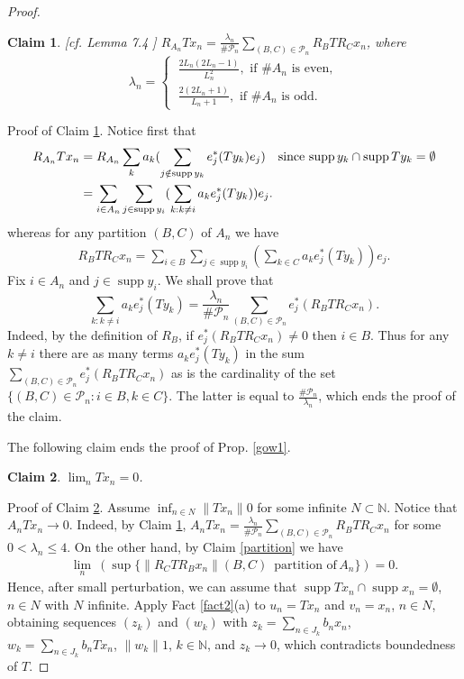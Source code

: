 \documentclass{amsart}
\newtheorem{claim}{Claim}
\numberwithin{subsection}{section}
\numberwithin{equation}{section}
\begin{document}
\begin{proof}
\begin{claim}\label{countlem}[cf. Lemma 7.4 \cite{ABR}] $R_{A_{n}}Tx_{n}=\frac{\lambda_n}{\# \mathcal{P}_n} \sum_{(B,C)\in \mathcal{P}_n}R_{B}TR_{C}x_n$, where 
$$
\lambda_n=
\begin{cases}
\ \frac{2L_n(2L_n-1)}{L_n^2}, \text{ if } \# A_{n} \text{ is even},
\\
\ \frac{2(2L_n+1)}{L_{n}+1}, \text{  if } \# A_{n} \text{ is odd}.
\end{cases}
$$
\end{claim}
Proof of Claim \ref{countlem}. Notice first that 
\begin{align*}\label{gml1}
R_{A_{n}}Tx_n&=R_{A_{n}}\sum_ka_k(\sum_{j\notin\operatorname{supp} y_{k}}e_j^*(Ty_k)e_j)\quad\textrm{since}\, \operatorname{supp} y_{k}\cap\operatorname{supp} Ty_{k}=\emptyset\\
&=\sum_{i\in A_{n}}\sum_{j\in\operatorname{supp} y_{i}}(\sum_{k: k\ne i}a_{k}e_{j}^{*}(Ty_{k}))e_{j}.
\notag
\end{align*}
whereas for any partition $(B,C)$ of $A_n$ we have
\begin{align*}
R_{B}TR_{C}x_{n}=\sum_{i\in B}\sum_{j\in\operatorname{supp} y_{i}}(\sum_{k\in C}a_{k}e^{*}_{j}(Ty_{k}))e_{j}.
\end{align*}
Fix $i\in A_n$ and $j\in \operatorname{supp} y_i$. We shall prove that 
$$
\sum_{k: k\ne i}a_{k}e_{j}^{*}(Ty_{k})=\frac{\lambda_n}{\# \mathcal{P}_n} \sum_{(B,C)\in \mathcal{P}_n}e_j^*(R_{B}TR_{C}x_n).
$$
Indeed, by the definition of $R_B$,  if  $e_{j}^{*}(R_{B}TR_{C}x_n)\neq 0$ then $i\in B$. Thus for any $k\ne i$ there are as many terms $a_{k}e_{j}^{*}(Ty_{k})$ in the sum $\sum_{(B,C)\in\mathcal{P}_{n}}e_{j}^{*}(R_{B}TR_{C}x_{n})$  as is the cardinality of the set $\{(B,C)\in\mathcal{P}_{n}: i\in B, k\in C\}$. The latter is equal to $\frac{\# \mathcal{P}_n}{\lambda_n}$, which ends the proof of the claim. 

The following claim ends the proof of Prop. \ref{gow1}.
\begin{claim}\label{final}
 $\lim_nTx_n= 0$.
\end{claim}
Proof of Claim \ref{final}. Assume $\inf_{n\in N}{\lVert Tx_n\rVert}0$ for some infinite $N\subset{{\mathbb{N}}}$. Notice that $A_nTx_n\to 0$. Indeed, by Claim \ref{countlem}, $A_nTx_n=\frac{\lambda_n}{\# \mathcal{P}_n}\sum_{(B,C)\in \mathcal{P}_n}R_{B}TR_{C}x_n$ for some $0<\lambda_n\leq 4$. On the other hand, by Claim \ref{partition} we have 
\begin{align*}
 \lim_{n}\ (\sup\{{\lVert R_{C}TR_{B}x_{n}\rVert} (B,C)\,\textrm{ partition of}\, A_{n}\}) =0 .
\end{align*}
Hence, after small perturbation, we can assume that $\operatorname{supp} Tx_n\cap \operatorname{supp} x_n=\emptyset$, $n\in N$ with $N$ infinite. Apply Fact \ref{fact2}(a) to $u_n=Tx_n$ and $v_n=x_n$, $n\in N$, obtaining sequences $(z_k)$ and $(w_k)$ with $z_k=\sum_{n\in J_k}b_nx_n$, $w_k=\sum_{n\in J_k}b_nTx_n$, ${\lVert w_k\rVert}1$, $k\in{{\mathbb{N}}}$, and $z_k\to 0$, which contradicts boundedness of $T$.  

\end{proof}
\end{document}
